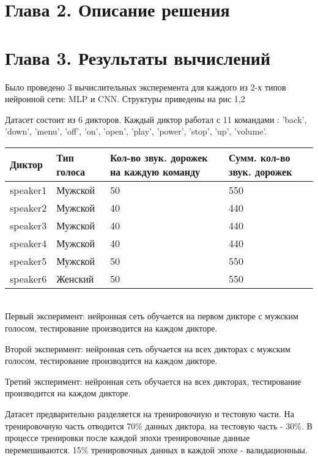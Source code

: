 \documentclass[14pt]{article}
\begin{document}
\section*{Глава 2. Описание решения}

\section*{Глава 3. Результаты вычислений}
Было проведено 3 вычислительных эксперемента для каждого из 2-х типов нейронной сети: MLP и CNN. Структуры приведены на рис 1,2

Датасет состоит из 6 дикторов. Каждый диктор работал с 11 командами : 'back', 'down', 'menu', 'off', 'on', 'open', 'play', 'power', 'stop', 'up', 'volume'.
\\

\begin{tabular}[c]{ | p{2cm} | p{2cm} | p{3cm} | p{3cm} | }
\hline
Диктор & Тип голоса & Кол-во звук. дорожек на каждую команду & Сумм. кол-во звук. дорожек  \\ \hline
speaker1 & Мужской & 50 & 550 \\ \hline
speaker2 & Мужской & 40 & 440 \\ \hline
speaker3 & Мужской & 40 & 440 \\ \hline
speaker4 & Мужской & 40 & 440 \\ \hline
speaker5 & Мужской & 50 & 550 \\ \hline
speaker6 & Женский & 50 & 550 \\ \hline
\end{tabular}
\\

Первый эксперимент: нейронная сеть обучается на первом дикторе с мужским голосом, тестирование производится на каждом дикторе. 

Второй эксперимент: нейронная сеть обучается на всех дикторах с мужским голосом, тестирование производится на каждом дикторе. 

Третий эксперимент: нейронная сеть обучается на всех дикторах, тестирование производится на каждом дикторе.

Датасет предварительно разделяется на тренировочную и тестовую части. На тренировочную часть отводится 70\% данных диктора, на тестовую часть - 30\%. В процессе тренировки после каждой эпохи тренировочные данные перемешиваются. 15\% тренировочных данных в каждой эпохе - валидационныы.
\end{document}
